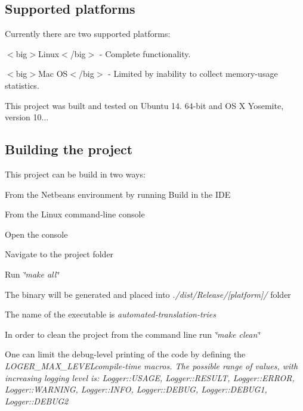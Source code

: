 \subsection*{Supported platforms}

Currently there are two supported platforms\+:
\begin{DoxyItemize}
\item $<$big$>$Linux$<$/big$>$ -\/ Complete functionality.
\item $<$big$>$Mac O\+S$<$/big$>$ -\/ Limited by inability to collect memory-\/usage statistics.
\end{DoxyItemize}

This project was built and tested on Ubuntu 14. 64-\/bit and O\+S X Yosemite, version 10...

\subsection*{Building the project}

This project can be build in two ways\+:


\begin{DoxyItemize}
\item From the Netbeans environment by running Build in the I\+D\+E
\item From the Linux command-\/line console
\begin{DoxyItemize}
\item Open the console
\item Navigate to the project folder
\item Run {\itshape \char`\"{}make all\char`\"{}}
\item The binary will be generated and placed into {\itshape ./dist/\+Release/\mbox{[}platform\mbox{]}/} folder
\item The name of the executable is {\itshape automated-\/translation-\/tries}
\end{DoxyItemize}
\end{DoxyItemize}

In order to clean the project from the command line run {\itshape \char`\"{}make clean\char`\"{}}

One can limit the debug-\/level printing of the code by defining the {\itshape L\+O\+G\+E\+R\+\_\+\+M\+A\+X\+\_\+\+L\+E\+V\+E\+L{\itshape  compile-\/time macros. The possible range of values, with increasing logging level is\+: Logger\+::\+U\+S\+A\+G\+E, Logger\+::\+R\+E\+S\+U\+L\+T, Logger\+::\+E\+R\+R\+O\+R, Logger\+::\+W\+A\+R\+N\+I\+N\+G, Logger\+::\+I\+N\+F\+O, Logger\+::\+D\+E\+B\+U\+G, Logger\+::\+D\+E\+B\+U\+G1, Logger\+::\+D\+E\+B\+U\+G2}}

